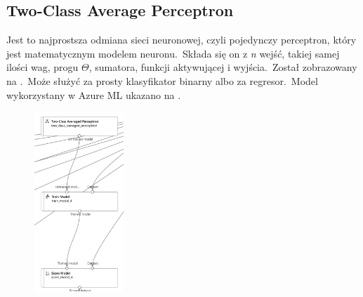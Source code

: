 \vfill
\pagebreak

\subsection{Two-Class Average Perceptron}
Jest to najprostsza odmiana sieci neuronowej, czyli pojedynczy perceptron, który jest matematycznym modelem neuronu.\ Składa się on z \textit{n} wejść, takiej samej ilości wag, progu $\Theta$, sumatora, funkcji aktywującej i wyjścia.\ Został zobrazowany na .\ Może służyć za prosty klasyfikator binarny albo za regresor.\ Model wykorzystany w Azure ML ukazano na .

\begin{figure}[H]
    \centering
    \includegraphics[width=0.3\textwidth]{images/ap_pipe}
    \label{fig:ap-pipe}
\end{figure}

\vfill
\pagebreak

